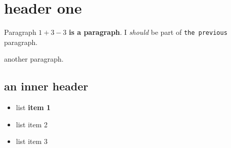 \hypertarget{header-one}{%
\section{header one}\label{header-one}}

Paragraph \(1+3-3\) \textbf{is a paragraph}. I \emph{should} be part of
\texttt{the\ previous} paragraph.

another paragraph.

\hypertarget{an-inner-header}{%
\subsection{an inner header}\label{an-inner-header}}

\begin{itemize}
\tightlist
\item
  list \textbf{item 1}
\item
  list item 2
\item
  list item 3
\end{itemize}
